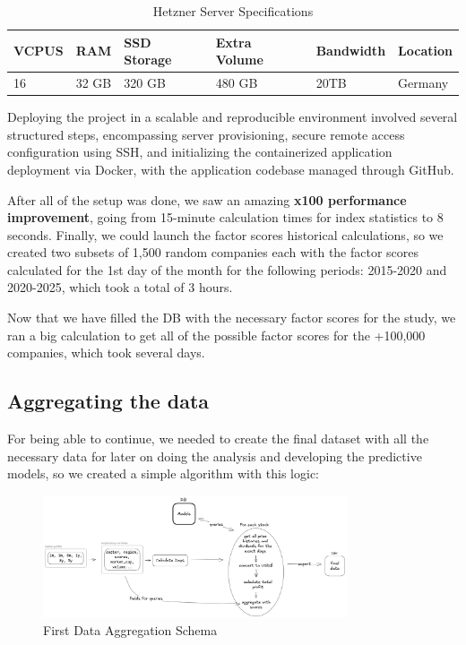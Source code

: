 \documentclass[11pt,english,a4paper,hidelinks]{book}
\begin{document}
\begin{table}[H]
    \centering
    \begin{tabular}{|l|l|l|l|l|l|}
        \hline
        \textbf{VCPUS} & \textbf{RAM} & \textbf{SSD Storage} & \textbf{Extra Volume} & \textbf{Bandwidth} & \textbf{Location} \\
        \hline
        16 & 32 GB & 320 GB & 480 GB & 20TB & Germany \\
        \hline
    \end{tabular}
    \caption{Hetzner Server Specifications}
    \label{tab:hetzner_server_specs}
\end{table}

\noindent Deploying the project in a scalable and reproducible environment involved several structured steps, encompassing server provisioning, secure remote access configuration using SSH, and initializing the containerized application deployment via Docker, with the application codebase managed through GitHub.

\vspace{0.5cm}  
\noindent After all of the setup was done, we saw an amazing \textbf{x100 performance improvement}, going from 15-minute calculation times for index statistics to 8 seconds. Finally, we could launch the factor scores historical calculations, so we created two subsets of 1,500 random companies each with the factor scores calculated for the 1st day of the month for the following periods: 2015-2020 and 2020-2025, which took a total of 3 hours.

\vspace{0.5cm}
\noindent Now that we have filled the DB with the necessary factor scores for the study, we ran a big calculation to get all of the possible factor scores for the +100,000 companies, which took several days.

\subsection{Aggregating the data}

For being able to continue, we needed to create the final dataset with all the necessary data for later on doing the analysis and developing the predictive models, so we created a simple algorithm with this logic:

\begin{figure}[H]
    \centering
    \includegraphics[width=0.8\textwidth]{images/tweenvest/First Data Aggregation Schema.png}
    \caption{First Data Aggregation Schema}
    \label{fig:first_data_aggregation_schema}
\end{figure}
\end{document}
